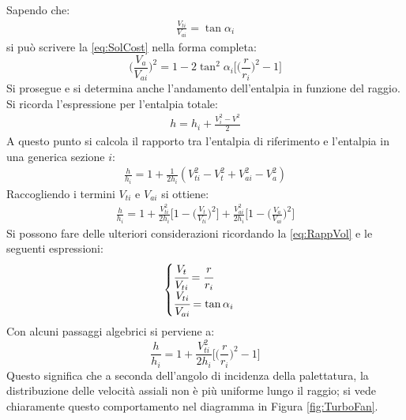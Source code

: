 Sapendo che:
\begin{align*}
\frac{V_{ti}}{V_{ai}} = \tan \alpha_i
\end{align*}
si può scrivere la \ref{eq:SolCost} nella forma completa:
\begin{equation}
\boxed{ \bigg( \frac{V_a}{V_{ai}} \bigg)^2 = 1- 2 \tan^2 \alpha_i \bigg[ \bigg( \frac{r}{r_i} \bigg)^2 -1 \bigg] }
\label{eq:RappVol}
\end{equation}
Si prosegue e si determina anche l'andamento dell'entalpia in funzione del raggio. Si ricorda l'espressione per l'entalpia totale:
\begin{align*}
h = h_i + \frac{V_i^2 - V^2}{2}
\end{align*}
A questo punto si calcola il rapporto tra l'entalpia di riferimento e l'entalpia in una generica sezione $i$:
\begin{align*}
\frac{h}{h_i} = 1+ \frac{1}{2 h_i} (V_{ti}^2 - V_t^2 + V_{ai}^2 -V_a^2)
\end{align*}
Raccogliendo i termini $V_{ti}$ e $V_{ai}$ si ottiene:
\begin{align*}
\frac{h}{h_i} = 1+ \frac{V_{ti}^2}{2 h_i} \bigg[ 1- \bigg( \frac{V_t}{V_{ti}} \bigg)^2 \bigg] + \frac{V_{ai}^2}{2 h_i} \bigg[ 1- \bigg( \frac{V_a}{V_{ai}} \bigg)^2 \bigg]
\end{align*}
Si possono fare delle ulteriori considerazioni ricordando la \ref{eq:RappVol} e le seguenti espressioni:
\begin{align*}
\begin{cases}
\cfrac{V_t}{V_{ti}} = \cfrac{r}{r_i}\\
\cfrac{V_{ti}}{V_{ai}} = \tan \alpha_i
\end{cases}
\end{align*}
Con alcuni passaggi algebrici si perviene a:
\begin{equation}
\boxed{ \frac{h}{h_i} = 1+ \frac{V_{ti}^2}{2h_i} \bigg[ \bigg( \frac{r}{r_i} \bigg)^2 -1 \bigg] }
\label{eq:rappEntalpie}
\end{equation}
Questo significa che a seconda dell'angolo di incidenza della palettatura, la distribuzione delle velocità assiali non è più uniforme lungo il raggio; si vede chiaramente questo comportamento nel diagramma in Figura \ref{fig:TurboFan}.
